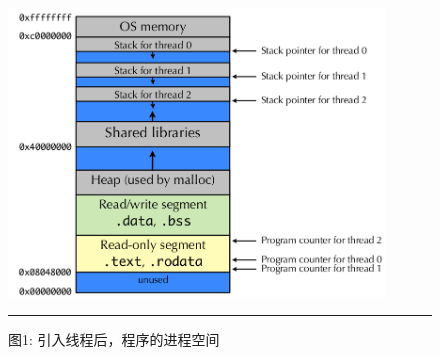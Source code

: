 \documentclass[a4paper, 11pt]{article}
\begin{document}
\begin{figure}[htbp]
  \centering
  \includegraphics[width=10cm, keepaspectratio]{thread-va.png}
  \par\vspace{0pt}
  \rule{10cm}{0.1ex}
  \par{图1: 引入线程后，程序的进程空间}
\end{figure}
\end{document}
